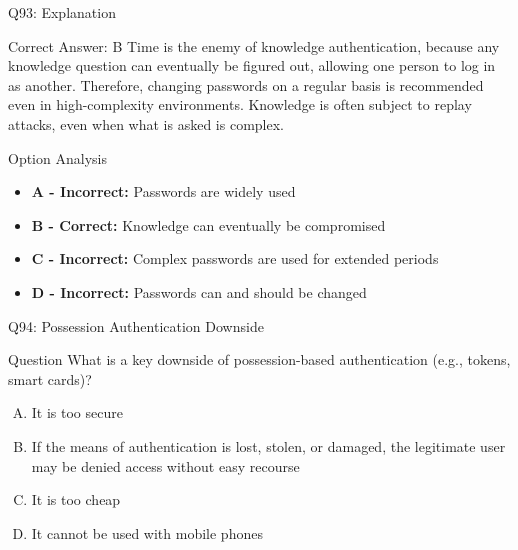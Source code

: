 \documentclass{beamer}
\begin{document}
	\begin{frame}{Q93: Explanation}
		\begin{block}{Correct Answer: B}
			Time is the enemy of knowledge authentication, because any knowledge question can eventually be figured out, allowing one person to log in as another. Therefore, changing passwords on a regular basis is recommended even in high-complexity environments. Knowledge is often subject to replay attacks, even when what is asked is complex.
		\end{block}
		\begin{block}{Option Analysis}
			\begin{itemize}
				\item \textbf{A - Incorrect:} Passwords are widely used
				\item \textbf{B - Correct:} Knowledge can eventually be compromised
				\item \textbf{C - Incorrect:} Complex passwords are used for extended periods
				\item \textbf{D - Incorrect:} Passwords can and should be changed
			\end{itemize}
		\end{block}
	\end{frame}
	
	\begin{frame}{Q94: Possession Authentication Downside}
		\begin{block}{Question}
			What is a key downside of possession-based authentication (e.g., tokens, smart cards)?
		\end{block}
		\begin{enumerate}[(A)]
			\item It is too secure
			\item If the means of authentication is lost, stolen, or damaged, the legitimate user may be denied access without easy recourse
			\item It is too cheap
			\item It cannot be used with mobile phones
		\end{enumerate}
	\end{frame}
	
\end{document}
